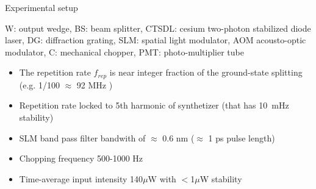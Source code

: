 \begin{block}{Experimental setup}
  \begin{figure}
    \begin{center}
      \setlength\fboxsep{5pt}
      \setlength\fboxrule{0.5pt}
    \end{center}
    \label{Schematic of the experimental setup}
  \end{figure}
  W: output wedge, BS: beam splitter, CTSDL: cesium two-photon stabilized diode laser, DG: diffraction grating, SLM: spatial light modulator, AOM acousto-optic modulator, C: mechanical chopper, PMT: photo-multiplier tube
  \begin{itemize}
  \item The repetition rate $f_{rep}$ is near integer fraction of the ground-state splitting (e.g. 1/100 $\approx$ 92 MHz )
  \item Repetition rate locked to 5th harmonic of synthetizer (that has 10~mHz stability)
  \item SLM band pass filter bandwith of $\approx$ 0.6 nm ($\approx$ 1 ps pulse length)
  \item Chopping frequency 500-1000 Hz
  \item Time-average input intensity 140$\mu$W with $<$1$\mu$W stability 
  \end{itemize}
\end{block}
